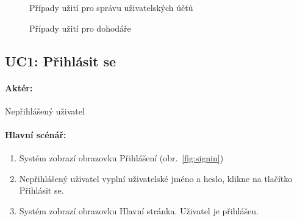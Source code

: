 \documentclass[twoside]{ctuthesis}
\begin{document}
\begin{figure}[h!]


	\caption{Případy užití pro správu uživatelských účtů}
	\label{fig:uc-account}
\end{figure}

\begin{figure}[p!]
		
		\caption{Případy užití pro dohodáře}
		\label{fig:uc-employee}
\end{figure}


\newpage
\subsection{UC1: Přihlásit se}
\paragraph{Aktér:} Nepřihlášený uživatel
\paragraph{Hlavní scénář:}
	\begin{enumerate}
		\item Systém zobrazí obrazovku Přihlášení (obr.~\ref{fig:signin})
		\item Nepřihlášený uživatel vyplní uživatelské jméno a heslo, klikne na tlačítko Přihlásit se.
		\item Systém zobrazí obrazovku Hlavní stránka. Uživatel je přihlášen.
	\end{enumerate}
\end{document}
